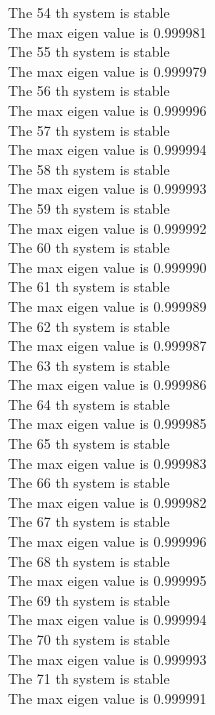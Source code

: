 \documentclass[11pt]{article}
\begin{document}
The 54 th system is stable \\
The max eigen value is 0.999981 \\
The 55 th system is stable \\
The max eigen value is 0.999979 \\
The 56 th system is stable \\
The max eigen value is 0.999996 \\
The 57 th system is stable \\
The max eigen value is 0.999994 \\
The 58 th system is stable \\
The max eigen value is 0.999993 \\
The 59 th system is stable \\
The max eigen value is 0.999992 \\
The 60 th system is stable \\
The max eigen value is 0.999990 \\
The 61 th system is stable \\
The max eigen value is 0.999989 \\
The 62 th system is stable \\
The max eigen value is 0.999987 \\
The 63 th system is stable \\
The max eigen value is 0.999986 \\
The 64 th system is stable \\
The max eigen value is 0.999985 \\
The 65 th system is stable \\
The max eigen value is 0.999983 \\
The 66 th system is stable \\
The max eigen value is 0.999982 \\
The 67 th system is stable \\
The max eigen value is 0.999996 \\
The 68 th system is stable \\
The max eigen value is 0.999995 \\
The 69 th system is stable \\
The max eigen value is 0.999994 \\
The 70 th system is stable \\
The max eigen value is 0.999993 \\
The 71 th system is stable \\
The max eigen value is 0.999991 \\
\end{document}
